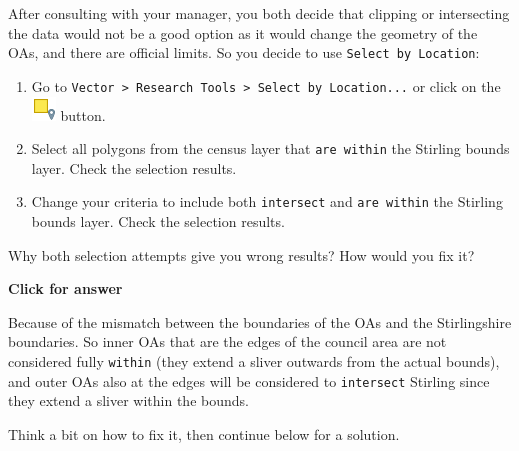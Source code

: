 \documentclass[
  letterpaper,
  DIV=11,
  numbers=noendperiod]{scrreprt}
\begin{document}
After consulting with your manager, you both decide that clipping or
intersecting the data would not be a good option as it would change the
geometry of the OAs, and there are official limits. So you decide to use
\texttt{Select\ by\ Location}:

\begin{enumerate}
\def\labelenumi{(\arabic{enumi})}
\setcounter{enumi}{283}
\item
  Go to
  \texttt{Vector\ \textgreater{}\ Research\ Tools\ \textgreater{}\ Select\ by\ Location...}
  or click on the
  \includegraphics{index_files/mediabag/mAlgorithmSelectLoca.png}
  button.
\item
  Select all polygons from the census layer that \texttt{are\ within}
  the Stirling bounds layer. Check the selection results.
\item
  Change your criteria to include both \texttt{intersect} and
  \texttt{are\ within} the Stirling bounds layer. Check the selection
  results.
\end{enumerate}

\begin{tcolorbox}[enhanced jigsaw, coltitle=black, toprule=.15mm, breakable, opacitybacktitle=0.6, left=2mm, colback=white, leftrule=.75mm, rightrule=.15mm, colbacktitle=quarto-callout-important-color!10!white, toptitle=1mm, titlerule=0mm, colframe=quarto-callout-important-color-frame, arc=.35mm, bottomtitle=1mm, opacityback=0, bottomrule=.15mm, title=\textcolor{quarto-callout-important-color}{\faExclamation}\hspace{0.5em}{Stop and Think}]

Why both selection attempts give you wrong results? How would you fix
it?

\end{tcolorbox}

\begin{tcolorbox}[enhanced jigsaw, toprule=.15mm, breakable, left=2mm, colframe=quarto-callout-important-color-frame, colback=white, arc=.35mm, leftrule=.75mm, opacityback=0, rightrule=.15mm, bottomrule=.15mm]

\vspace{-3mm}\textbf{Click for answer}\vspace{3mm}

Because of the mismatch between the boundaries of the OAs and the
Stirlingshire boundaries. So inner OAs that are the edges of the council
area are not considered fully \texttt{within} (they extend a sliver
outwards from the actual bounds), and outer OAs also at the edges will
be considered to \texttt{intersect} Stirling since they extend a sliver
within the bounds.

Think a bit on how to fix it, then continue below for a solution.

\end{tcolorbox}
\end{document}
